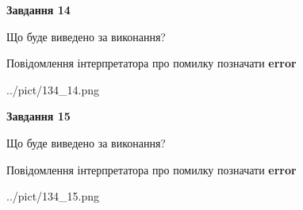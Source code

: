 \documentclass[11pt, ukrainian]{article}
\begin{document}
{\begin {large}
{\begin {center}\textbf{Завдання 14}\end {center}}\par
Що буде виведено за виконання? \par
Повідомлення інтерпретатора про помилку позначати \textbf{error}

\begin{center}
	{../pict/134_14.png}
\end{center}
\newpage

{\begin {center}\textbf{Завдання 15}\end {center}}\par
Що буде виведено за виконання? \par
Повідомлення інтерпретатора про помилку позначати \textbf{error}

\begin{center}
	{../pict/134_15.png}
\end{center}
\newpage

\end {large}}
\end{document}
